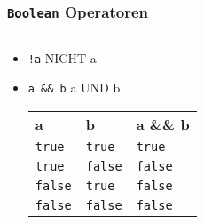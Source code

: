 \documentclass{../../presentation}
\begin{document}
\begin{frame}[fragile]
  \frametitle{\texttt{Boolean} Operatoren}
  \pause
  \begin{columns}
    \begin{column}{0.5\textwidth}
      \begin{itemize}
        \item \texttt{!a} \quad \textrightarrow \quad NICHT a
              \pause
        \item \texttt{a \&\& b} \quad \textrightarrow \quad a UND b\\[0.3em]
              \pause
              {
                \begin{tabular}{l l l}
                  \rowcolor{tablehead}
                  \textbf{a}     & \textbf{b}     & \textbf{a \&\& b} \\
                  \texttt{true}  & \texttt{true}  & \texttt{true}     \\
                  \texttt{true}  & \texttt{false} & \texttt{false}    \\
                  \texttt{false} & \texttt{true}  & \texttt{false}    \\
                  \texttt{false} & \texttt{false} & \texttt{false}    \\
                \end{tabular}
              }
      \end{itemize}
    \end{column}


\end{columns}
\end{frame}
\end{document}
